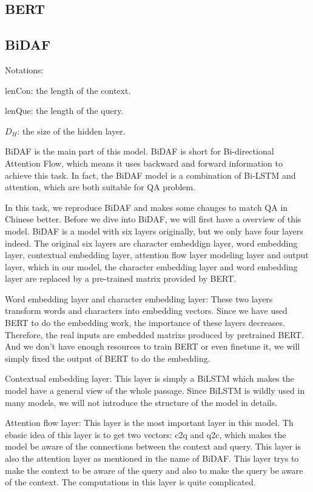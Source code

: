 \documentclass{article}
\begin{document}
\subsection{BERT}
\subsection{BiDAF}
Notations:
 
lenCon: the length of the context.

lenQue: the length of the query.

$D_H$: the size of the hidden layer.

BiDAF is the main part of this model. BiDAF is short for Bi-directional Attention Flow, which means it uses backward and forward information to achieve this task. In fact, the BiDAF model is a combination of Bi-LSTM and attention, which are both suitable for QA problem.

In this task, we reproduce BiDAF and makes some changes to match QA in Chinese better. Before we dive into BiDAF, we will first have a overview of this model. BiDAF is a model with six layers originally, but we only have four layers indeed. The original six layers are character embeddign layer, word embedding layer, contextual embedding layer, attention flow layer modeling layer and output layer, which in our model, the character embedding layer and word embedding layer are replaced by a pre-trained matrix provided by BERT. 

Word embedding layer and character embedding layer: These two layers transform words and characters into embedding vectors. Since we have used BERT to do the embedding work, the importance of these layers decreases. Therefore, the real inputs are embedded matrixs produced by pretrained BERT. And we don't have enough resources to train BERT or even finetune it, we will simply fixed the output of BERT to do the embedding.

Contextual embedding layer: This layer is simply a BiLSTM which makes the model have a general view of the whole passage. Since BiLSTM is wildly used in many models, we will not introduce the structure of the model in details. 

Attention flow layer: This layer is the most important layer in this model. Th ebasic idea of this layer is to get two vectors: c2q and q2c, which makes the model be aware of the connections between the context and query. This layer is also the attention layer as mentioned in the name of BiDAF. This layer trys to make the context to be aware of the query and also to make the query be aware of the context. The computations in this layer is quite complicated. 
\end{document}
